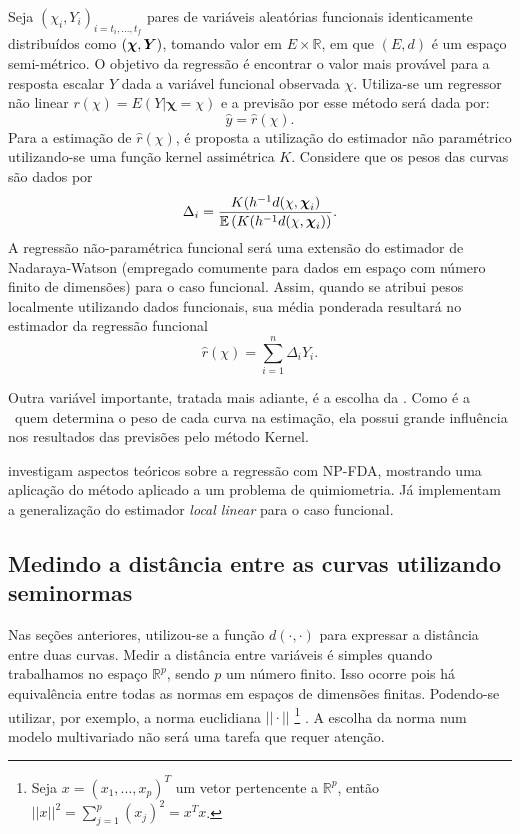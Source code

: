 \documentclass[
	12pt,				%
	openright,			%
	oneside,			%
	a4paper,			%
	english,			%
	brazil				%
	]{dissertacao-ufrgs-abntex2}
\begin{document}
Seja $(\chi_i,Y_i)_{i=t_i,...,t_f}$ pares de variáveis aleatórias funcionais identicamente distribuídos como $(\boldsymbol{\chi},\boldsymbol{Y})$, tomando valor em $E \times \mathbb{R}$, em que $(E,d)$ é um espaço semi-métrico. O objetivo da regressão é encontrar o valor mais provável para a resposta escalar $Y$ dada a variável funcional observada $\chi$.
Utiliza-se um regressor não linear $r(\chi)=E(Y|\boldsymbol{\chi}=\chi)$
e a previsão por esse método será dada por:
\[
\hat{y}=\hat{r}(\chi).
\]
Para a estimação de $\hat{r}(\chi)$, é proposta a utilização do estimador
não paramétrico utilizando-se uma função kernel assimétrica $K$. Considere que os pesos das curvas são dados por
\begin{equation} \label{peso-local}
\Delta_i=\frac{K(h^{-1}d(\chi,\boldsymbol{\chi}_{i})}{\mathbb{E} \left( K(h^{-1}d(\chi,\boldsymbol{\chi}_{i}) \right)}.
\end{equation}
A regressão não-paramétrica funcional será uma extensão do estimador de Nadaraya-Watson (empregado comumente para dados em espaço com número finito de dimensões) para o caso funcional. 
Assim, quando se atribui pesos localmente utilizando dados funcionais, sua média ponderada resultará no estimador da regressão funcional
\begin{equation} \label{eq:regressao-npfda}
	\hat{r}(\chi) = \sum_{i=1}^n \Delta_i Y_i.
\end{equation}

Outra variável importante, tratada mais adiante, é a escolha da \bw. Como é a \bw~quem determina o peso de cada curva na estimação, ela possui grande influência nos resultados das previsões pelo método Kernel.

 investigam aspectos teóricos sobre a regressão com NP-FDA, mostrando uma aplicação do método aplicado a um problema de quimiometria. Já  implementam a generalização do estimador \emph{local linear} para o caso funcional.



\subsection{Medindo a distância entre as curvas utilizando seminormas} \label{sub:semimetricas}

Nas seções anteriores, utilizou-se a função $d(\cdot,\cdot)$ para expressar
a distância entre duas curvas. Medir a distância entre variáveis é
simples quando trabalhamos no espaço $\mathbb{R}^{p}$, sendo $p$
um número finito. Isso ocorre pois há equivalência entre todas as
normas em espaços de dimensões finitas. Podendo-se utilizar, por exemplo,
a norma euclidiana $||\cdot||$%
\footnote{Seja $x=(x_{1},...,x_{p})^{T}$ um vetor pertencente a $\mathbb{R}^{p}$,
então$||x||^{2}=\sum_{j=1}^{p}(x_{j})^{2}=x^{T}x$.%
} . A escolha da norma num modelo multivariado não será uma tarefa
que requer atenção.
\end{document}
